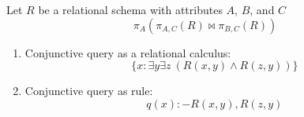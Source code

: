 Let $R$ be a relational schema with attributes $A$, $B$, and $C$
\begin{equation*}
  \pi_{A}(\pi_{A,C}(R) \bowtie  \pi_{B,C}(R))
\end{equation*}
\begin{enumerate}
  \item Conjunctive query as a relational calculus:
  \begin{equation*}
    \{x : \exists y \exists z \: (R(x,y) \land R(z,y))\}
  \end{equation*}
  \item Conjunctive query as rule:
  \begin{equation*}
    q(x) :- R(x,y),R(z,y)
  \end{equation*}
\end{enumerate}